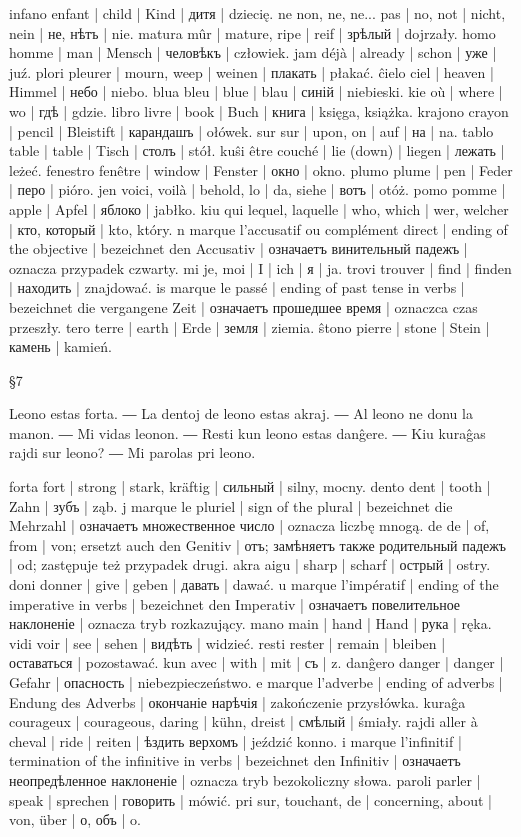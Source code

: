 infano enfant | child | Kind | дитя | dziecię.
ne non, ne, ne... pas | no, not | nicht, nein | не, нѣтъ | nie.
matura mûr | mature, ripe | reif | зрѣлый | dojrzały.
homo homme | man | Mensch | человѣкъ | człowiek.
jam déjà | already | schon | уже | juź.
plori pleurer | mourn, weep | weinen | плакать | płakać.
ĉielo ciel | heaven | Himmel | небо | niebo.
blua bleu | blue | blau | синій | niebieski.
kie où | where | wo | гдѣ | gdzie.
libro livre | book | Buch | книга | księga, książka.
krajono crayon | pencil | Bleistift | карандашъ | ołówek.
sur sur | upon, on | auf | на | na.
tablo table | table | Tisch | столъ | stół.
kuŝi être couché | lie (down) | liegen | лежать | leżeć.
fenestro fenêtre | window | Fenster | окно | okno.
plumo plume | pen | Feder | перо | pióro.
jen voici, voilà | behold, lo | da, siehe | вотъ | otóż.
pomo pomme | apple | Apfel | яблоко | jabłko.
kiu qui lequel, laquelle | who, which | wer, welcher | кто, который | kto, który.
n marque l’accusatif ou complément direct | ending of the objective | bezeichnet den Accusativ | означаетъ винительный падежъ | oznacza przypadek czwarty.
mi je, moi | I | ich | я | ja.
trovi trouver | find | finden | находить | znajdować.
is marque le passé | ending of past tense in verbs | bezeichnet die vergangene Zeit | означаетъ прошедшее время | oznaczca czas przeszły.
tero terre | earth | Erde | земля | ziemia.
ŝtono pierre | stone | Stein | камень | kamień.

§7

Leono estas forta. ― La dentoj de leono estas akraj. ― Al leono ne donu la manon. ― Mi vidas leonon. ― Resti kun leono estas danĝere. ― Kiu kuraĝas rajdi sur leono? ― Mi parolas pri leono.

forta fort | strong | stark, kräftig | сильный | silny, mocny.
dento dent | tooth | Zahn | зубъ | ząb.
j marque le pluriel | sign of the plural | bezeichnet die Mehrzahl | означаетъ множественное число | oznacza liczbę mnogą.
de de | of, from | von; ersetzt auch den Genitiv | отъ; замѣняетъ также родительный падежъ | od; zastępuje też przypadek drugi.
akra aigu | sharp | scharf | острый | ostry.
doni donner | give | geben | давать | dawać.
u marque l’impératif | ending of the imperative in verbs | bezeichnet den Imperativ | означаетъ повелительное наклоненіе | oznacza tryb rozkazujący.
mano main | hand | Hand | рука | ręka.
vidi voir | see | sehen | видѣть | widzieć.
resti rester | remain | bleiben | оставаться | pozostawać.
kun avec | with | mit | съ | z.
danĝero danger | danger | Gefahr | опасность | niebezpieczeństwo.
e marque l’adverbe | ending of adverbs | Endung des Adverbs | окончаніе нарѣчія | zakończenie przysłówka.
kuraĝa courageux | courageous, daring | kühn, dreist | смѣлый | śmiały.
rajdi aller à cheval | ride | reiten | ѣздить верхомъ | jeździć konno.
i marque l’infinitif | termination of the infinitive in verbs | bezeichnet den Infinitiv | означаетъ неопредѣленное наклоненіе | oznacza tryb bezokoliczny słowa.
paroli parler | speak | sprechen | говорить | mówić.
pri sur, touchant, de | concerning, about | von, über | о, объ | o.

